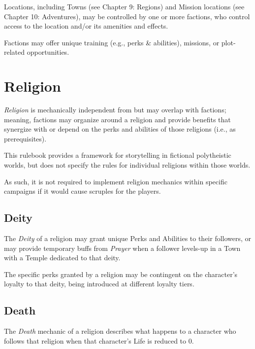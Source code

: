 Locations, including Towns (see Chapter 9: Regions) and Mission locations (see Chapter 10: Adventures), 
may be controlled by one or more factions, 
who control access to the location and/or its amenities and effects.

\vspace{0.4em}

Factions may offer unique training (e.g., perks \& abilities), missions, or plot-related opportunities.


\newpage


\section{Religion}
\textit{Religion} is mechanically independent from but may overlap with factions;
meaning, factions may organize around a religion and provide benefits that synergize with or 
depend on the perks and abilities of those religions (i.e., as prerequisites).

\begin{DesignerNote}
  This rulebook provides a framework for storytelling in fictional polytheistic worlds,
  but does not specify the rules for individual religions within those worlds.

  \vspace{0.4em}

  As such, it is not required to implement religion mechanics within specific campaigns 
  if it would cause scruples for the players.
\end{DesignerNote}


\subsection{Deity}
The \textit{Deity} of a religion may grant unique Perks and Abilities to their followers,
or may provide temporary buffs from \textit{Prayer} when a follower levels-up in a Town with a 
Temple dedicated to that deity.

\vspace{0.4em}

The specific perks granted by a religion may be contingent on the character's loyalty to that deity,
being introduced at different loyalty tiers.


\subsection{Death}
The \textit{Death} mechanic of a religion describes what happens to a character who follows that religion
when that character's Life is reduced to 0.

